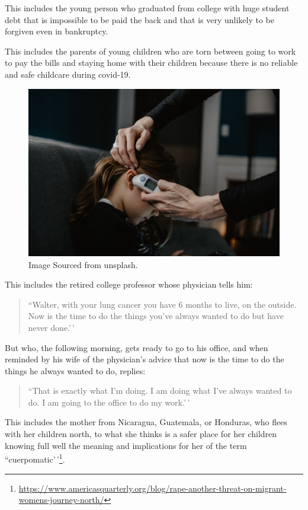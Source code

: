 \documentclass[
]{book}
\begin{document}
This includes the young person who graduated from college with huge student debt that is impossible to be paid the back and that is very unlikely to be forgiven even in bankruptcy.

This includes the parents of young children who are torn between going to work to pay the bills and staying home with their children because there is no reliable and safe childcare during covid-19.

\begin{figure}

{\centering \includegraphics[width=0.5\linewidth]{img/ch0/fig5} 

}

\caption{Image Sourced from unsplash.}\label{fig:fig005}
\end{figure}

This includes the retired college professor whose physician tells him:

\begin{quote}
``Walter, with your lung cancer you have 6 months to live, on the outside. Now is the time to do the things you've always wanted to do but have never done.'\,'
\end{quote}

But who, the following morning, gets ready to go to his office, and when reminded by his wife of the physician's advice that now is the time to do the things he always wanted to do, replies:

\begin{quote}
``That is exactly what I'm doing. I am doing what I've always wanted to do. I am going to the office to do my work.'\,'
\end{quote}

This includes the mother from Nicaragua, Guatemala, or Honduras, who flees with her children north, to what she thinks is a safer place for her children knowing full well the meaning and implications for her of the term ``cuerpomatic'\,'\footnote{\url{https://www.americasquarterly.org/blog/rape-another-threat-on-migrant-womens-journey-north/}}.
\end{document}
